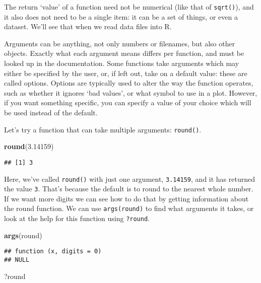 \documentclass[]{book}
\newenvironment{Shaded}{\begin{snugshade}}{\end{snugshade}}
\newcommand{\FloatTok}[1]{\textcolor[rgb]{0.00,0.00,0.81}{#1}}
\newcommand{\KeywordTok}[1]{\textcolor[rgb]{0.13,0.29,0.53}{\textbf{#1}}}
\newcommand{\NormalTok}[1]{#1}
\begin{document}
The return `value' of a function need not be numerical (like that of \texttt{sqrt()}), and it also does not need to be a single item: it can be a set of things, or even a dataset. We'll see that when we read data files into R.

Arguments can be anything, not only numbers or filenames, but also other objects. Exactly what each argument means differs per function, and must be looked up in the documentation. Some functions take arguments which may either be specified by the user, or, if left out, take on a default value: these are called options. Options are typically used to alter the way the function operates, such as whether it ignores `bad values', or what symbol to use in a plot. However, if you want something specific, you can specify a value of your choice which will be used instead of the default.

Let's try a function that can take multiple arguments: \texttt{round()}.

\begin{Shaded}
\begin{Highlighting}[]
\KeywordTok{round}\NormalTok{(}\FloatTok{3.14159}\NormalTok{)}
\end{Highlighting}
\end{Shaded}

\begin{verbatim}
## [1] 3
\end{verbatim}

Here, we've called \texttt{round()} with just one argument, \texttt{3.14159}, and it has returned the value \texttt{3}. That's because the default is to round to the nearest whole number. If we want more digits we can see how to do that by getting information about the round function. We can use \texttt{args(round)} to find what arguments it takes, or look at the help for this function using \texttt{?round}.

\begin{Shaded}
\begin{Highlighting}[]
\KeywordTok{args}\NormalTok{(round)}
\end{Highlighting}
\end{Shaded}

\begin{verbatim}
## function (x, digits = 0) 
## NULL
\end{verbatim}

\begin{Shaded}
\begin{Highlighting}[]
\NormalTok{?round}
\end{Highlighting}
\end{Shaded}
\end{document}
